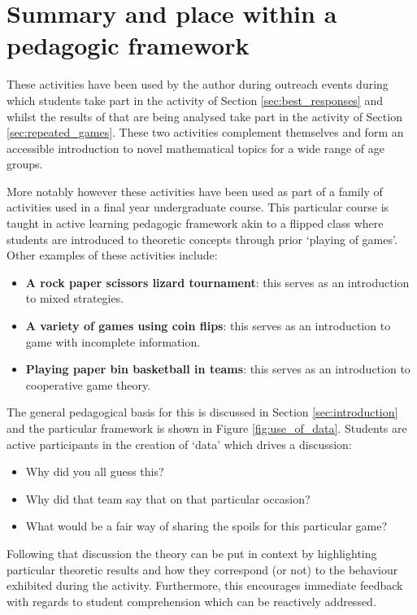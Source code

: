 \documentclass{article}
\begin{document}
\section{Summary and place within a pedagogic framework}\label{sec:summary}

These activities have been used by the author during outreach events during
which students take part in the activity of Section \ref{sec:best_responses} and
whilst the results of that are being analysed take part in the activity of
Section \ref{sec:repeated_games}. These two activities complement themselves and
form an accessible introduction to novel mathematical topics for a wide range of
age groups.

More notably however these activities have been used as part of a family of
activities used in a final year undergraduate course. This particular course is
taught in active learning pedagogic framework akin to a flipped class where
students are introduced to theoretic concepts through prior `playing of games'.
Other examples of these activities include:

\begin{itemize}
    \item \textbf{A rock paper scissors lizard tournament}: this serves as an
        introduction to mixed strategies.
    \item \textbf{A variety of games using coin flips}: this serves as an
        introduction to game with incomplete information.
    \item \textbf{Playing paper bin basketball in teams}: this serves as an
        introduction to cooperative game theory.
\end{itemize}

The general pedagogical basis for this is discussed in Section
\ref{sec:introduction} and the particular framework is shown in Figure
\ref{fig:use_of_data}. Students are active participants in the creation of
`data' which drives a discussion:

\begin{itemize}
    \item Why did you all guess this?
    \item Why did that team say that on that particular occasion?
    \item What would be a fair way of sharing the spoils for this particular
        game?
\end{itemize}

Following that discussion the theory can be put in context by highlighting
particular theoretic results and how they correspond (or not) to the behaviour
exhibited during the activity. Furthermore, this encourages immediate
feedback with regards to student comprehension which can be reactively
addressed.
\end{document}

